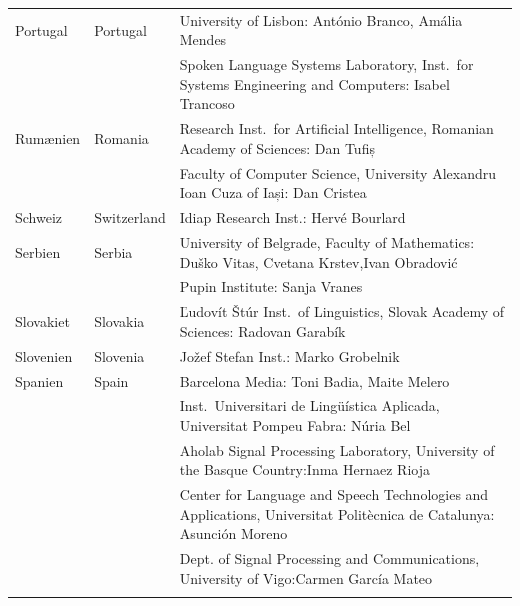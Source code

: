 \begin{longtable}{llp{113mm}}
  Portugal & \textcolor{grey1}{Portugal} & University of Lisbon: António Branco, Amália Mendes \\ \addlinespace
  & & Spoken Language Systems Laboratory, Inst.~for Systems Engineering and Computers: Isabel Trancoso \\ \addlinespace
  
  Rum\ae nien & \textcolor{grey1}{Romania} & Research Inst.~for Artificial Intelligence, Romanian Academy of Sciences: Dan Tufiș \\ \addlinespace
  & & Faculty of Computer Science, University Alexandru Ioan Cuza of Iași: Dan Cristea \\ \addlinespace
  
  Schweiz & \textcolor{grey1}{Switzerland} & Idiap Research Inst.: Hervé Bourlard \\ \addlinespace 
  
  Serbien & \textcolor{grey1}{Serbia} & University of Belgrade, Faculty of Mathematics: Duško Vitas, Cvetana Krstev,\newline Ivan Obradović \\ \addlinespace
  & & Pupin Institute: Sanja Vranes \\ \addlinespace  
  
  Slovakiet & \textcolor{grey1}{Slovakia} & Ľudovít Štúr Inst.~of Linguistics, Slovak Academy of Sciences: Radovan Garabík \\ \addlinespace  
  
  Slovenien & \textcolor{grey1}{Slovenia} & Jožef Stefan Inst.: Marko Grobelnik \\ \addlinespace  
  
  Spanien & \textcolor{grey1}{Spain} & Barcelona Media: Toni Badia, Maite Melero \\ \addlinespace 
  & & Inst.~Universitari de Lingüística Aplicada, Universitat Pompeu Fabra: Núria Bel \\ \addlinespace 
  & & Aholab Signal Processing Laboratory, University of the Basque Country:\newline Inma Hernaez Rioja \\ \addlinespace 
  & & Center for Language and Speech Technologies and Applications, Universitat Politècnica de Catalunya:  Asunción Moreno \\ \addlinespace 
  & & Dept. of Signal Processing and Communications, University of Vigo:\newline Carmen García Mateo \\ \addlinespace
  

\end{longtable}
